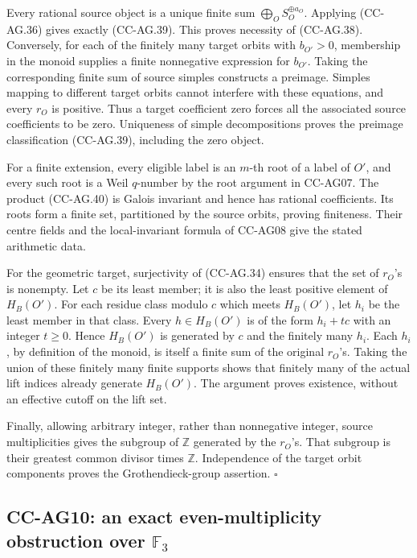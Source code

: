 Every rational source object is a unique finite sum
\(\bigoplus_O S_O^{\oplus a_O}\).  Applying (CC-AG.36)
gives exactly (CC-AG.39).  This proves necessity of
(CC-AG.38).  Conversely, for each of the finitely many
target orbits with \(b_{O'}>0\), membership in the monoid
supplies a finite nonnegative expression for \(b_{O'}\).
Taking the corresponding finite sum of source simples
constructs a preimage.  Simples mapping to different
target orbits cannot interfere with these equations, and
every \(r_O\) is positive.  Thus a target coefficient zero
forces all the associated source coefficients to be zero.
Uniqueness of simple decompositions proves the preimage
classification (CC-AG.39), including the zero object.

For a finite extension, every eligible label is an
\(m\)-th root of a label of \(O'\), and every such root
is a Weil \(q\)-number by the root argument in CC-AG07.
The product (CC-AG.40) is Galois invariant and hence has
rational coefficients.  Its roots form a finite set,
partitioned by the source orbits, proving finiteness.
Their centre fields and the local-invariant formula of
CC-AG08 give the stated arithmetic data.

For the geometric target, surjectivity of (CC-AG.34)
ensures that the set of \(r_O\)'s is nonempty.  Let
\(c\) be its least member; it is also the least positive
element of \(H_B(O')\).  For each residue class modulo
\(c\) which meets \(H_B(O')\), let \(h_i\) be the least
member in that class.  Every \(h\in H_B(O')\) is of
the form \(h_i+tc\) with an integer \(t\ge0\).
Hence \(H_B(O')\) is generated by \(c\) and the finitely
many \(h_i\).  Each \(h_i\), by definition of the monoid,
is itself a finite sum of the original \(r_O\)'s.
Taking the union of these finitely many finite supports
shows that finitely many of the actual lift indices
already generate \(H_B(O')\).  The argument proves
existence, without an effective cutoff on the lift set.

Finally, allowing arbitrary integer, rather than
nonnegative integer, source multiplicities gives the
subgroup of \(\mathbb Z\) generated by the \(r_O\)'s.
That subgroup is their greatest common divisor times
\(\mathbb Z\).  Independence of the target orbit
components proves the Grothendieck-group assertion.
\(\square\)

\subsection{CC-AG10: an exact even-multiplicity obstruction over
\(\mathbb F_3\)}

